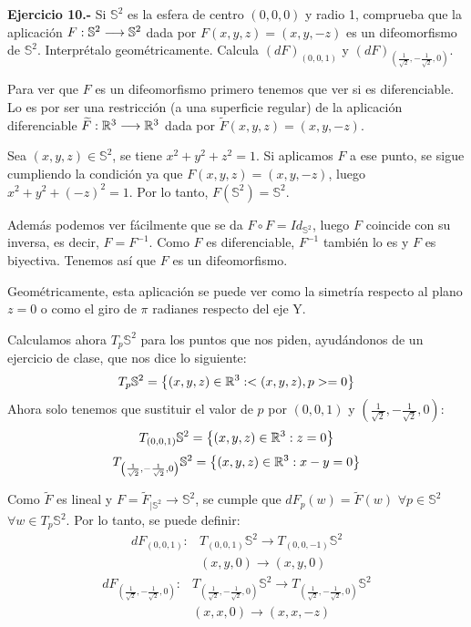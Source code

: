 \documentclass[12pt]{article}
\begin{document}
\textbf{Ejercicio 10.-} Si $\mathbb{S}^2$ es la esfera de centro $(0,0,0)$ y radio 1, comprueba que la aplicación $F : \mathbb{S}^2 \longrightarrow \mathbb{S}^2$ dada por $F(x,y,z)=(x,y,-z)$ es un difeomorfismo de $\mathbb{S}^2$. Interprétalo geométricamente. Calcula $(dF)_{(0,0,1)}$ y $(dF)_{\left(\frac{1}{\sqrt{2}},-\frac{1}{\sqrt{2}},0\right)}$.

\medskip

Para ver que $F$ es un difeomorfismo primero tenemos que ver si es diferenciable. Lo es por ser una restricción (a una superficie regular) de la aplicación diferenciable $\widetilde{F} : \mathbb{R}^3 \longrightarrow \mathbb{R}^3$ dada por $\widetilde{F}(x,y,z)=(x,y,-z)$. 

Sea $(x,y,z)\in \mathbb{S}^2$, se tiene $x^2+y^2+z^2=1$. Si aplicamos $F$ a ese punto, se sigue cumpliendo la condición ya que $F(x,y,z)=(x,y,-z)$, luego $x^2+y^2+(-z)^2=1$. Por lo tanto, $F(\mathbb{S}^2)=\mathbb{S}^2$.

Además podemos ver fácilmente que se da $F\circ F=Id_{\mathbb{S}^2}$, luego $F$ coincide con su inversa, es decir, $F=F^{-1}$. Como $F$ es diferenciable, $F^{-1}$ también lo es y $F$ es biyectiva. Tenemos así que $F$ es un difeomorfismo.

Geométricamente, esta aplicación se puede ver como la simetría respecto al plano $z=0$ o como el giro de $\pi$ radianes respecto del eje Y.

Calculamos ahora $T_p\mathbb{S}^2$ para los puntos que nos piden, ayudándonos de un ejercicio de clase, que nos dice lo siguiente:
\[
T_p\mathbb{S}^2=\left\{ (x,y,z)\in\mathbb{R}^3:<(x,y,z),p>=0 \right\}
\]
Ahora solo tenemos que sustituir el valor de $p$ por $(0,0,1)$ y $\left(\frac{1}{\sqrt{2}},-\frac{1}{\sqrt{2}},0\right)$:
\[
T_{(0,0,1)}\mathbb{S}^2=\left\{ (x,y,z)\in\mathbb{R}^3: z=0 \right\}
\]
\[
T_{\left(\frac{1}{\sqrt{2}},-\frac{1}{\sqrt{2}},0\right)}\mathbb{S}^2=\left\{ (x,y,z)\in\mathbb{R}^3: x-y=0 \right\}
\]

Como $\widetilde{F}$ es lineal y $F=\widetilde{F}_{|\mathbb{S}^2}\longrightarrow \mathbb{S}^2$, se cumple que $dF_p(w)=\widetilde{F}(w)$ $\forall p\in \mathbb{S}^2$ $\forall w\in T_p\mathbb{S}^2$. Por lo tanto, se puede definir:
\[
\begin{array}{ll}
dF_{(0,0,1)}: & T_{(0,0,1)}\mathbb{S}^2 \longrightarrow T_{(0,0,-1)}\mathbb{S}^2 \\
              & (x,y,0)   \longrightarrow (x,y,0)
\end{array}
\]
\[
\begin{array}{ll}
dF_{\left(\frac{1}{\sqrt{2}},-\frac{1}{\sqrt{2}},0\right)}: & T_{\left(\frac{1}{\sqrt{2}},-\frac{1}{\sqrt{2}},0\right)}\mathbb{S}^2 \longrightarrow T_{\left(\frac{1}{\sqrt{2}},-\frac{1}{\sqrt{2}},0\right)}\mathbb{S}^2 \\
              & (x,x,0)   \longrightarrow (x,x,-z)
\end{array}
\]
\end{document}

